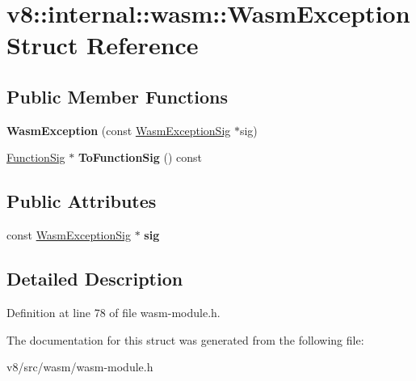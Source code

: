 \hypertarget{structv8_1_1internal_1_1wasm_1_1WasmException}{}\section{v8\+:\+:internal\+:\+:wasm\+:\+:Wasm\+Exception Struct Reference}
\label{structv8_1_1internal_1_1wasm_1_1WasmException}
\subsection*{Public Member Functions}
\begin{DoxyCompactItemize}
\item 
\mbox{\label{structv8_1_1internal_1_1wasm_1_1WasmException_a99855e1612e854c24c2f55b46abdfc81}} 
{\bfseries Wasm\+Exception} (const \mbox{\hyperlink{classv8_1_1internal_1_1Signature}{Wasm\+Exception\+Sig}} $\ast$sig)
\item 
\mbox{\label{structv8_1_1internal_1_1wasm_1_1WasmException_a1cc1f444472cd59c5fe4b033b9c6b054}} 
\mbox{\hyperlink{classv8_1_1internal_1_1Signature}{Function\+Sig}} $\ast$ {\bfseries To\+Function\+Sig} () const
\end{DoxyCompactItemize}
\subsection*{Public Attributes}
\begin{DoxyCompactItemize}
\item 
\mbox{\label{structv8_1_1internal_1_1wasm_1_1WasmException_af59f7ef80820ab6b6e81413d9eb701e3}} 
const \mbox{\hyperlink{classv8_1_1internal_1_1Signature}{Wasm\+Exception\+Sig}} $\ast$ {\bfseries sig}
\end{DoxyCompactItemize}


\subsection{Detailed Description}


Definition at line 78 of file wasm-\/module.\+h.



The documentation for this struct was generated from the following file\+:\begin{DoxyCompactItemize}
\item 
v8/src/wasm/wasm-\/module.\+h\end{DoxyCompactItemize}
